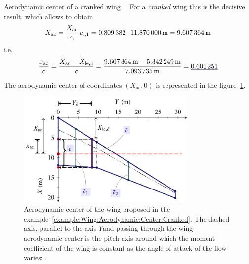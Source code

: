 \documentclass[[12pt,twoside]{book}
\begin{document}
\begin{myExampleX}{Aerodynamic center of a cranked wing}{\ \myIconGraph\ }
For a \emph{cranked} wing this is the decisive result, which allows to
obtain
\[
X_{\mathrm{ac}} = \frac{X_{\mathrm{ac}}}{c_\mathrm{r}} \, c_{\mathrm{r},1}
  = \SI[round-precision=3]{\myXACOverChordRootDatcomWing}{}
    \cdot \SI[round-precision=2]{\myChordRootWingIMT}{\metre}
  = \SI[round-precision=2]{\myACWingToApexWingMT}{\metre} 
\]
i.e.
\[
\frac{x_{\mathrm{ac}}}{\bar{c}}
  = 
  \frac{
    X_{\mathrm{ac}} - X_{\mathrm{le},\bar{c}}
  }{
    \bar{c}
  }
  =
  \frac{
    \SI[round-precision=2]{\myACWingToApexWingMT}{\metre}
      - \SI[round-precision=2]{\myXXMACLEToApexWingCrankedMT}{\metre}
  }{
    \SI[round-precision=2]{\myMACWingCrankedMT}{\metre}
  }
  =
  \mathunderline{mydarkblue}{ \SI[round-precision=3]{\myXsiACWing}{} }  
\]

The aerodynamic center of coordinates $(X_\mathrm{ac},0)$
is represented in the figure~\ref{fig:Wing:Aerodynamic:Center:Cranked:Results}.

\begin{figure}[t]%
    \includegraphics[width=0.78\textwidth]{Chapter_2/aerodynamic_center_of_a_cranked_wing/wing_ac_cranked_1_drawing.pdf}
  \caption{
         Aerodynamic center of the wing proposed in the example~\ref{example:Wing:Aerodynamic:Center:Cranked}. The dashed axis,
           parallel to the axis $Y$and passing through the wing aerodynamic center
           is the pitch axis around which the moment coefficient
           of the wing is constant as the angle of attack of the flow varies:
          .
  }
  \label{fig:Wing:Aerodynamic:Center:Cranked:Results}%
\end{figure}
\end{myExampleX}
\end{document}
